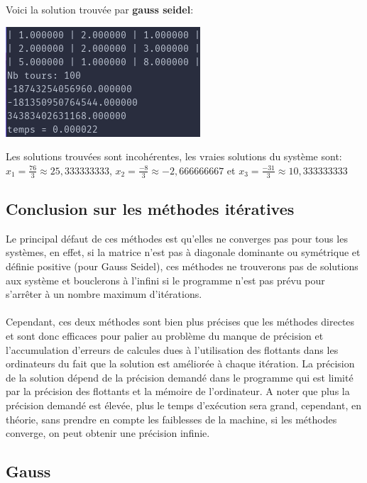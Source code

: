\documentclass[a4paper]{article}
\begin{document}
Voici la solution trouvée par \textbf{gauss seidel}:

\includegraphics[scale=0.5]{./img/gauss_seidel/g_e_fail.png}

Les solutions trouvées sont incohérentes, les vraies solutions du système sont:
$x_{1} = \frac{76}{3} \approx 25,333333333$,
$x_{2} = \frac{-8}{3} \approx -2,666666667$ et
$x_{3} = \frac{-31}{3} \approx 10,333333333$


\subsection{Conclusion sur les méthodes itératives}

Le principal défaut de ces méthodes est qu'elles ne converges pas pour tous les
systèmes, en effet, si la matrice n'est pas à diagonale dominante ou symétrique
et définie positive (pour Gauss Seidel), ces méthodes ne trouverons pas de
solutions aux système et bouclerons à l'infini si le programme n'est pas prévu
pour s'arrêter à un nombre maximum d'itérations.
\\
\\
Cependant, ces deux méthodes sont bien plus précises que les méthodes directes
et sont donc efficaces pour palier au problème du manque de précision et
l'accumulation d'erreurs de calcules dues à l'utilisation des flottants dans les
ordinateurs du fait que la solution est améliorée à chaque itération. La
précision de la solution dépend de la précision demandé dans le programme qui
est limité par la précision des flottants et la mémoire de l'ordinateur. A noter
que plus la précision demandé est élevée, plus le temps d’exécution sera grand,
cependant, en théorie, sans prendre en compte les faiblesses de la machine, si
les méthodes converge, on peut obtenir une précision infinie.

\clearpage


\begin{appendix}
  \section*{Gauss}
  
\end{appendix}
\clearpage
\end{document}
